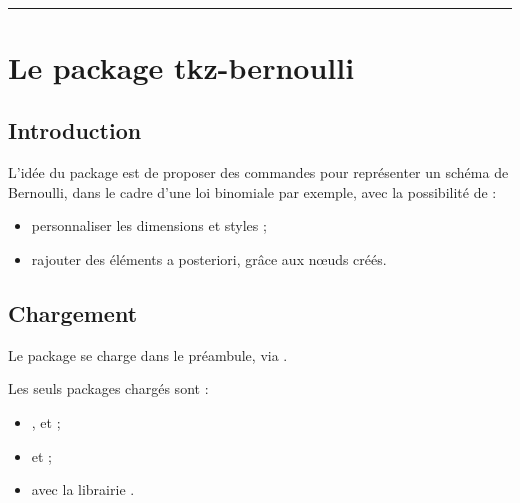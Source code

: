 \documentclass[french,11pt,a4paper]{article}
\begin{document}
\vfill~

\pagebreak


\hypertarget{matoc}{}

\tableofcontents

\vspace*{5mm}

\hrule

\vspace*{5mm}

\section{Le package tkz-bernoulli}

\subsection{Introduction}

L'idée du package  est de proposer des commandes pour représenter un schéma de Bernoulli, dans le cadre d'une loi binomiale par exemple, avec la possibilité de :

\begin{itemize}
	\item personnaliser les dimensions et styles ;
	\item rajouter des éléments a posteriori, grâce aux nœuds créés.
\end{itemize}

\subsection{Chargement}

Le package se charge dans le préambule, via .

Les seuls packages chargés sont :

\begin{itemize}
	\item {},  et  ;
	\item {} et  ;
	\item {} avec la librairie .
\end{itemize}

\begin{codehigh}[language=latex/latex2,style/main=cyan!10,style/code=cyan!10]
\usepackage{tkz-bernoulli}
\end{codehigh}
\end{document}
